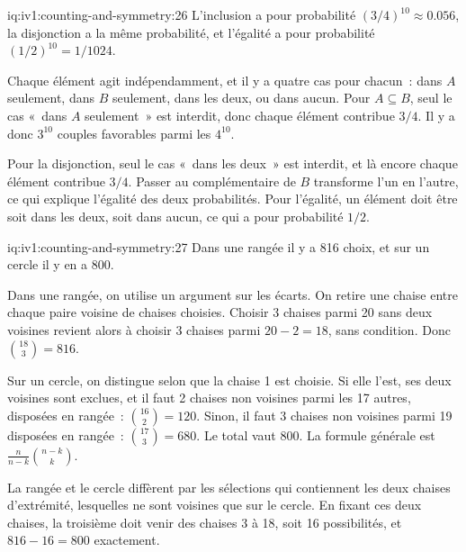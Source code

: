 \begin{solution}{iq:iv1:counting-and-symmetry:26}
L'inclusion a pour probabilité $(3/4)^{10} \approx 0.056$, la disjonction a la même probabilité, et l'égalité a pour probabilité $(1/2)^{10} = 1/1024$.

Chaque élément agit indépendamment, et il y a quatre cas pour chacun~: dans $A$ seulement, dans $B$ seulement, dans les deux, ou dans aucun. Pour $A \subseteq B$, seul le cas «~dans $A$ seulement~» est interdit, donc chaque élément contribue $3/4$. Il y a donc $3^{10}$ couples favorables parmi les $4^{10}$.

Pour la disjonction, seul le cas «~dans les deux~» est interdit, et là encore chaque élément contribue $3/4$. Passer au complémentaire de $B$ transforme l'un en l'autre, ce qui explique l'égalité des deux probabilités. Pour l'égalité, un élément doit être soit dans les deux, soit dans aucun, ce qui a pour probabilité $1/2$.

\end{solution}

\enlargethispage{-3\baselineskip}%
\begin{solution}{iq:iv1:counting-and-symmetry:27}
Dans une rangée il y a 816 choix, et sur un cercle il y en a 800.

Dans une rangée, on utilise un argument sur les écarts. On retire une chaise entre chaque paire voisine de chaises choisies. Choisir 3 chaises parmi 20 sans deux voisines revient alors à choisir 3 chaises parmi $20 - 2 = 18$, sans condition. Donc $\binom{18}{3} = 816$.

Sur un cercle, on distingue selon que la chaise 1 est choisie. Si elle l'est, ses deux voisines sont exclues, et il faut 2 chaises non voisines parmi les 17 autres, disposées en rangée~: $\binom{16}{2} = 120$. Sinon, il faut 3 chaises non voisines parmi 19 disposées en rangée~: $\binom{17}{3} = 680$. Le total vaut 800. La formule générale est $\frac{n}{n-k}\binom{n-k}{k}$.

La rangée et le cercle diffèrent par les sélections qui contiennent les deux chaises d'extrémité, lesquelles ne sont voisines que sur le cercle. En fixant ces deux chaises, la troisième doit venir des chaises 3 à 18, soit 16 possibilités, et $816 - 16 = 800$ exactement.

\end{solution}

